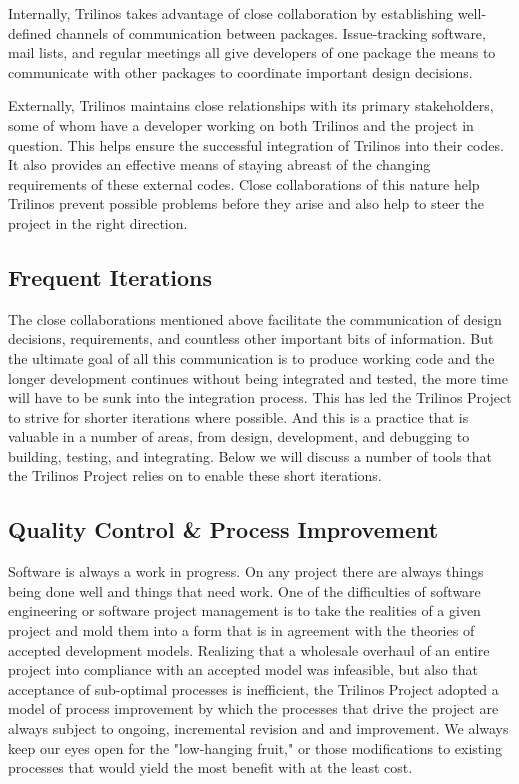 \documentclass[12pt,relax]{article}
\begin{document}
Internally, Trilinos takes advantage of close collaboration by establishing
well-defined channels of communication between packages.  Issue-tracking
software, mail lists, and regular meetings all give developers of one package
the means to communicate with other packages to coordinate important design
decisions.

Externally, Trilinos maintains close relationships with its primary
stakeholders, some of whom have a developer working on both Trilinos and the
project in question.  This helps ensure the successful integration of Trilinos
into their codes.  It also provides an effective means of staying abreast of
the changing requirements of these external codes.  Close collaborations of
this nature help Trilinos prevent possible problems before they arise and also
help to steer the project in the right direction.

\subsection{Frequent Iterations}

The close collaborations mentioned above facilitate the communication of 
design decisions, requirements, and countless other important bits of
information.  But the ultimate goal of all this communication is to produce
working code and the longer development continues without being integrated and
tested, the more time will have to be sunk into the integration process.  This
has led the Trilinos Project to strive for shorter iterations where possible.
And this is a practice that is valuable in a number of areas, from design,
development, and debugging to building, testing, and integrating.  Below we
will discuss a number of tools that the Trilinos Project relies on to enable
these short iterations.

\subsection{Quality Control \& Process Improvement}

Software is always a work in progress.  On any project there are always things
being done well and things that need work.  One of the difficulties of 
software engineering or software project management is to take the realities
of a given project and mold them into a form that is in agreement with the
theories of accepted development models.  Realizing that a wholesale overhaul
of an entire project into compliance with an accepted model was infeasible, but
also that acceptance of sub-optimal processes is inefficient, the Trilinos
Project adopted a model of process improvement by which the processes that drive
the project are always subject to ongoing, incremental revision and
and improvement.  We always keep our eyes open for the "low-hanging fruit," or
those modifications to existing processes that would yield the most benefit
with at the least cost.  
\end{document}
